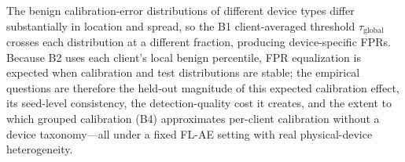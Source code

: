 The benign calibration-error distributions of different device types differ substantially
in location and spread, so the B1 client-averaged threshold $\tau_{\text{global}}$ crosses
each distribution at a different fraction, producing device-specific FPRs.
Because B2 uses each client's local benign percentile, FPR equalization is expected
when calibration and test distributions are stable; the empirical questions are therefore
the held-out magnitude of this expected calibration effect, its seed-level consistency,
the detection-quality cost it creates, and the extent to which grouped calibration (B4)
approximates per-client calibration without a device taxonomy---all under a fixed FL-AE
setting with real physical-device heterogeneity.
